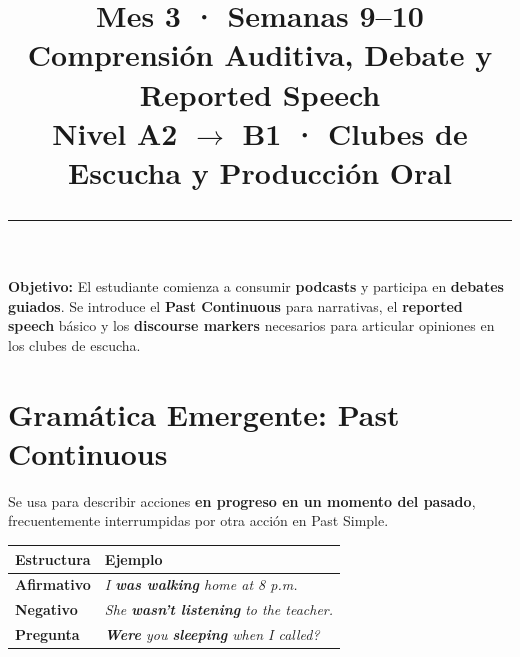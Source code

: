 \documentclass[12pt,a4paper]{article}
\title{%
  \vspace{-1cm}
  {\Huge\bfseries\textcolor{mes3}{Mes 3 · Semanas 9--10}}\\[0.3cm]
  {\Large Comprensión Auditiva, Debate y Reported Speech}\\[0.2cm]
  {\large\color{grissuave} Nivel A2 $\rightarrow$ B1 · Clubes de Escucha y Producción Oral}\\[0.5cm]
  \rule{\textwidth}{1.5pt}
}
\author{}
\date{}
\begin{document}
\maketitle
\thispagestyle{empty}

\begin{cajanivel}
\textbf{Objetivo:} El estudiante comienza a consumir \textbf{podcasts} y participa en \textbf{debates guiados}. Se introduce el \textbf{Past Continuous} para narrativas, el \textbf{reported speech} básico y los \textbf{discourse markers} necesarios para articular opiniones en los clubes de escucha.
\end{cajanivel}

\section{Gramática Emergente: Past Continuous}

\begin{cajagrammar}
Se usa para describir acciones \textbf{en progreso en un momento del pasado}, frecuentemente interrumpidas por otra acción en Past Simple.

\medskip
\begin{tabularx}{\textwidth}{@{} l X @{}}
\toprule
\textbf{Estructura} & \textbf{Ejemplo} \\
\midrule
\textbf{Afirmativo} & \textit{I \textbf{was walking} home at 8 p.m.} \\
\textbf{Negativo} & \textit{She \textbf{wasn't listening} to the teacher.} \\
\textbf{Pregunta} & \textit{\textbf{Were} you \textbf{sleeping} when I called?} \\
\bottomrule
\end{tabularx}
\end{cajagrammar}
\end{document}
